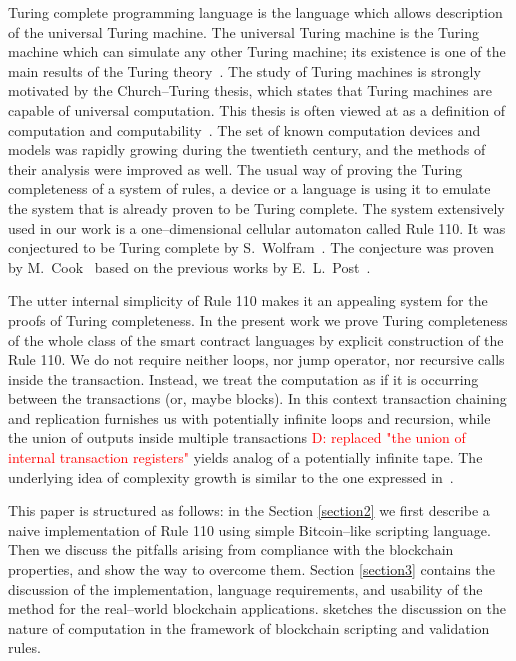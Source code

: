 \documentclass[runningheads]{llncs}
\newcommand{\dnote}[1]{\textcolor{red}{D: {#1}}}
\begin{document}
    Turing complete programming language is the language which allows
    description of the universal Turing machine. The universal Turing machine is
    the Turing machine which can simulate any other Turing machine; its
    existence is one of the main results of the Turing
    theory~\cite{turing1937computable}. The study of Turing machines is strongly
    motivated by the Church--Turing thesis, which states that Turing machines
    are capable of universal computation. This thesis is often viewed at as a
    definition of computation and computability~\cite{turing1939systems}. The
    set of known computation devices and models was rapidly growing during the
    twentieth century, and the methods of their analysis were improved as well.
    The usual way of proving the Turing completeness of a system of rules,
    a device or a language is using it to emulate the system that is already
    proven to be Turing complete.  The system extensively used in our work is a
    one--dimensional cellular automaton called Rule 110. It was conjectured to
    be Turing complete by S.~Wolfram~\cite{wolfram1986theory}. The conjecture
    was proven by M.~Cook~\cite{cook2004universality} based on the previous
    works by E.~L.~Post~\cite{post1943formal}.

    The utter internal simplicity of Rule 110 makes it an appealing system for
    the proofs of Turing completeness. In the present work we prove Turing
    completeness of the whole class of the smart contract languages by explicit
    construction of the Rule 110. We do not require neither loops, nor jump
    operator, nor recursive calls inside the transaction. Instead, we treat the
    computation as if it is occurring between the transactions (or, maybe
    blocks). In this context transaction chaining and replication furnishes us
    with potentially infinite loops and recursion, while the union of outputs
    inside multiple transactions \dnote{replaced "the union of internal transaction registers"}
    yields analog of a potentially infinite tape. The
    underlying idea of complexity growth is similar to the one expressed
    in~\cite{von1951general}.

    This paper is structured as follows: in the Section \ref{section2} we first
    describe a naive implementation of Rule 110 using simple Bitcoin--like
    scripting language.  Then we discuss the pitfalls arising from compliance
    with the blockchain properties, and show the way to overcome them.
    Section \ref{section3} contains the discussion of
    the implementation, language requirements, and usability of the method for
    the real--world blockchain applications.  sketches the discussion on the
    nature of computation in the framework of blockchain scripting and
    validation rules.
\end{document}
